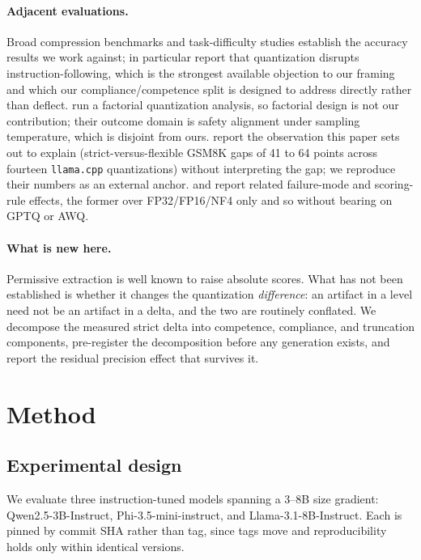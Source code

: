 \documentclass[11pt]{article}
\begin{document}
\paragraph{Adjacent evaluations.}
Broad compression benchmarks \citep{vonrad2026unicomp,wang2025slmquant} and
task-difficulty studies \citep{lee2025tradeoffs} establish the accuracy
results we work against; \citet{lee2025tradeoffs} in particular report that
quantization disrupts instruction-following, which is the strongest available
objection to our framing and which our compliance/competence split is designed
to address directly rather than deflect. \citet{prasad2026factorial} run a
factorial quantization analysis, so factorial design is not our contribution;
their outcome domain is safety alignment under sampling temperature, which is
disjoint from ours. \citet{kurt2026which} report the observation this paper
sets out to explain (strict-versus-flexible GSM8K gaps of 41 to 64 points
across fourteen \texttt{llama.cpp} quantizations) without interpreting the
gap; we reproduce their numbers as an external anchor.
\citet{oladri2026silent} and \citet{rasmussen2026calibration} report related
failure-mode and scoring-rule effects, the former over FP32/FP16/NF4 only and
so without bearing on GPTQ or AWQ.

\paragraph{What is new here.}
Permissive extraction is well known to raise absolute scores. What has not been
established is whether it changes the quantization \emph{difference}: an
artifact in a level need not be an artifact in a delta, and the two are
routinely conflated. We decompose the measured strict delta into competence,
compliance, and truncation components, pre-register the decomposition before any
generation exists, and report the residual precision effect that survives it.

\section{Method}
\label{sec:method}

\subsection{Experimental design}
\label{sec:design}
We evaluate three instruction-tuned models spanning a 3--8B size gradient:
Qwen2.5-3B-Instruct, Phi-3.5-mini-instruct, and Llama-3.1-8B-Instruct. Each is
pinned by commit SHA rather than tag, since tags move and reproducibility holds
only within identical versions.
\end{document}
